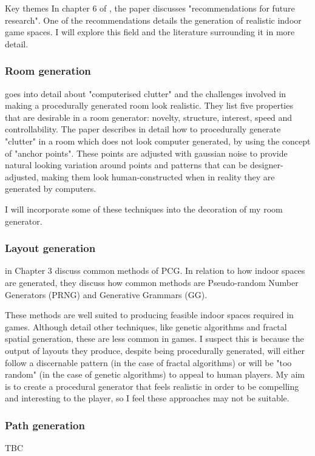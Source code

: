 \documentclass[review]{cmpreport}
\begin{document}
\begin{section}{Key themes}
In chapter 6 of \cite{Hendrikx:2013:PCG:2422956.2422957}, the paper discusses "recommendations for future research". One of the recommendations details the generation of realistic indoor game spaces. I will explore this field and the literature surrounding it in more detail. 

\subsubsection{Room generation}
\cite{taylor-parberry} goes into detail about "computerised clutter" and the challenges involved in making a procedurally generated room look realistic. They list five properties that are desirable in a room generator: novelty, structure, interest, speed and controllability. The paper describes in detail how to procedurally generate "clutter" in a room which does not look computer generated, by using the concept of "anchor points". These points are adjusted with gaussian noise to provide natural looking variation around points and patterns that can be designer-adjusted, making them look human-constructed when in reality they are generated by computers.\par
I will incorporate some of these techniques into the decoration of my room generator.

\subsubsection{Layout generation}
\cite{Hendrikx:2013:PCG:2422956.2422957} in Chapter 3 discuss common methods of PCG. In relation to how indoor spaces are generated, they discuss how common methods are Pseudo-random Number Generators (PRNG) and Generative Grammars (GG). \par
These methods are well suited to producing feasible indoor spaces required in games. Although \cite{Hendrikx:2013:PCG:2422956.2422957} detail other techniques, like genetic algorithms and fractal spatial generation, these are less common in games. I suspect this is because the output of layouts they produce, despite being procedurally generated, will either follow a discernable pattern (in the case of fractal algorithms) or will be "too random" (in the case of genetic algorithms) to appeal to human players. My aim is to create a procedural generator that feels realistic in order to be compelling and interesting to the player, so I feel these approaches may not be suitable.

\subsubsection{Path generation}
TBC

\end{section}
\end{document}
